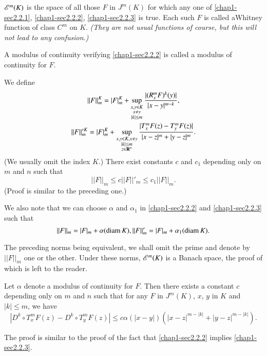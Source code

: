 \begin{definition}\label{chap1-defi2.3}
$\mathscr{E}^{m}(K)$ is the space of all those $F$ in $J^{m}(K)$ for which any one of \eqref{chap1-sec2.2.1}, \eqref{chap1-sec2.2.2}, \eqref{chap1-sec2.2.3} is true. Each such $F$ is called a\pageoriginale Whitney function of class $C^{m}$ on $K$. {\em (They are not usual functions of course, but this will not lead to any confusion.)}

A modulus of continuity verifying \eqref{chap1-sec2.2.2} is called a modulus of continuity for $F$.
\end{definition}

We define
\begin{gather*}
||F||^{K}_{m}=|F|^{K}_{m}+\sup\limits_{\substack{x,y\in K\\ x\neq y\\ |k|\leq m}}\dfrac{|(R^{m}_{x}F)^{k}(y)|}{|x-y|^{m-k}},\\
||F||'^{K}_{m}=|F|^{K}_{m}+\sup\limits_{\substack{x,y\in K, x\neq y\\ |k|\leq m\\ z\in \mathbf{R}^{n}}}\dfrac{|T^{m}_{x}F(z)-T^{m}_{y}F(z)|}{|x-z|^{m}+|y-z|^{m}}.
\end{gather*}
(We usually omit the index $K$.) There exist constants $c$ and $c_{1}$ depending only on $m$ and $n$ such that
$$
||F||_{m}\leq c ||F||'_{m}\leq c_{1}||F||_{m}.
$$
(Proof is similar to the preceding one.)

\begin{remark}\label{chap1-rem2.4}
We also note that we can choose $\alpha$ and $\alpha_{1}$ in \eqref{chap1-sec2.2.2} and \eqref{chap1-sec2.2.3} such that
$$
||F||_{m}=|F|_{m}+\alpha(\operatorname{diam} K), ||F||'_{m}=|F|_{m}+\alpha_{1}(\operatorname{diam} K).
$$

The preceding norms being equivalent, we shall omit the prime and denote by $||F||_{m}$ one or the other. Under these norms, $\mathscr{E}^{m}(K)$ is a Banach space, the proof of which is left to the reader.
\end{remark}

\begin{remark}\label{chap1-rem2.5}
Let $\alpha$ denote a modulus of continuity for $F$. Then there exists a constant $c$ depending only on $m$ and $n$ such that for any $F$ in $J^{m}(K)$, $x$, $y$ in $K$ and $|k|\leq m$, we have
$$
|D^{k}\circ T^{m}_{x}F(z)-D^{k}\circ T^{m}_{y}F(z)|\leq c\alpha (|x-y|)(|x-z|^{m-|k|}+|y-z|^{m-|k|}).
$$

The proof is similar to the proof of the fact that \eqref{chap1-sec2.2.2} implies \eqref{chap1-sec2.2.3}.
\end{remark}

